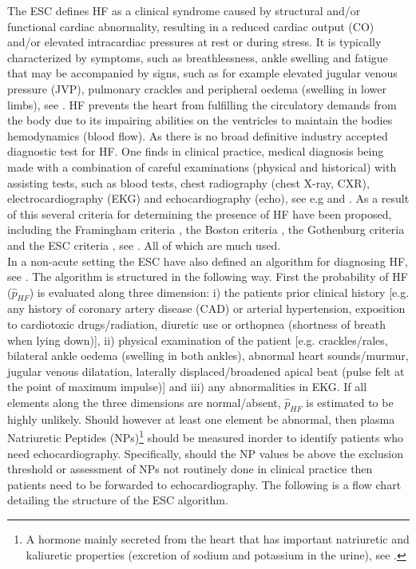 \documentclass[../thesis.tex]{subfiles}
\begin{document}
\noindent The ESC defines HF as a clinical syndrome caused by structural and/or functional cardiac abnormality, resulting in a reduced cardiac output (CO) and/or elevated intracardiac pressures at rest or during stress. It is typically characterized by symptoms, such as breathlessness, ankle swelling and fatigue that may be accompanied by signs, such as for example elevated jugular venous pressure (JVP), pulmonary crackles and peripheral oedema (swelling in lower limbs), see \cite[page.~2136]{ponikowski20162016}. HF prevents the heart from fulfilling the circulatory demands from the body due to its impairing abilities on the ventricles to maintain the bodies hemodynamics (blood flow). As there is no broad definitive industry accepted diagnostic test for HF. One finds in clinical practice, medical diagnosis being made with a combination of careful examinations (physical and historical) with assisting tests, such as blood tests, chest radiography (chest X-ray, CXR), electrocardiography (EKG) and echocardiography (echo), see e.g \cite{henein2010heart} and \cite{son2012decision}. As a result of this several criteria for determining the presence of HF have been proposed, including the Framingham criteria \citep{mckee1971natural}, the Boston criteria \citep{carlson1985analysis}, the Gothenburg criteria \citep{eriksson1987cardiac} and the ESC criteria \citep{swedberg2005guidelines}, see \cite{roger2010heart}. All of which are much used.\\
\indent In a non-acute setting the ESC have also defined an algorithm for diagnosing HF, see \citep[page.~2140]{ponikowski20162016}. The algorithm is structured in the following way. First the probability of HF ($\hat{p}_{HF}$) is evaluated along three dimension: i) the patients prior clinical history [e.g. any history of coronary artery disease (CAD) or arterial hypertension, exposition to cardiotoxic drugs/radiation, diuretic use or orthopnea (shortness of breath when lying down)], ii) physical examination of the patient [e.g. crackles/rales, bilateral ankle oedema (swelling in both ankles), abnormal heart sounds/murmur, jugular venous dilatation, laterally displaced/broadened apical beat (pulse felt at the point of maximum impulse)] and iii) any abnormalities in EKG. If all elements along the three dimensions are normal/absent, $\hat{p}_{HF}$ is estimated to be highly unlikely. Should however at least one element be abnormal, then plasma Natriuretic Peptides (NPs)\footnote{A hormone mainly secreted from the heart that has important natriuretic and kaliuretic properties (excretion of sodium and potassium in the urine), see \cite{pandit2011natriuretic}.} should be measured inorder to identify patients who need echocardiography. Specifically, should the NP values be above the exclusion threshold or assessment of NPs not routinely done in clinical practice then patients need to be forwarded to echocardiography. The following is a flow chart detailing the structure of the ESC algorithm.
\end{document}
